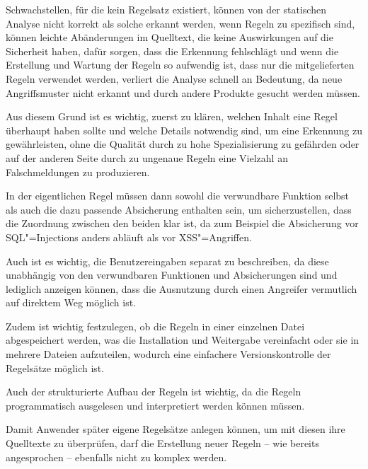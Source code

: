         Schwachstellen,
        für die kein Regelsatz existiert,
        können von der statischen Analyse nicht korrekt als solche erkannt werden,
        wenn Regeln zu spezifisch sind,
        können leichte Abänderungen im Quelltext,
        die keine Auswirkungen auf die Sicherheit haben,
        dafür sorgen,
        dass die Erkennung fehlschlägt und
        wenn die Erstellung und
        Wartung der Regeln so aufwendig ist,
        dass nur die mitgelieferten Regeln verwendet werden,
        verliert die Analyse schnell an Bedeutung,
        da neue Angriffsmuster nicht erkannt und
        durch andere Produkte gesucht werden müssen.

        Aus diesem Grund ist es wichtig,
        zuerst zu klären,
        welchen Inhalt eine Regel überhaupt haben sollte und
        welche Details notwendig sind,
        um eine Erkennung zu gewährleisten,
        ohne die Qualität durch zu hohe Spezialisierung zu gefährden oder
        auf der anderen Seite durch zu ungenaue Regeln eine Vielzahl an Falschmeldungen zu produzieren.

        In der eigentlichen Regel müssen dann sowohl die verwundbare Funktion selbst als auch die dazu passende Absicherung enthalten sein,
        um sicherzustellen,
        dass die Zuordnung zwischen den beiden klar ist,
        da zum Beispiel die Absicherung vor
        \gls{SQL}"=Injections anders abläuft als vor
        \gls{XSS}"=Angriffen.

        Auch ist es wichtig,
        die Benutzereingaben separat zu beschreiben,
        da diese unabhängig von den verwundbaren Funktionen und
        Absicherungen sind und
        lediglich anzeigen können,
        dass die Ausnutzung durch einen Angreifer vermutlich auf direktem Weg möglich ist.

        Zudem ist wichtig festzulegen,
        ob die Regeln in einer einzelnen Datei abgespeichert werden,
        was die Installation und
        Weitergabe vereinfacht oder
        sie in mehrere Dateien aufzuteilen,
        wodurch eine einfachere Versionskontrolle der Regelsätze möglich ist.

        Auch der strukturierte Aufbau der Regeln ist wichtig,
        da die Regeln programmatisch ausgelesen und
        interpretiert werden können müssen.

        Damit Anwender später eigene Regelsätze anlegen können,
        um mit diesen ihre Quelltexte zu überprüfen,
        darf die Erstellung neuer Regeln
        -- wie bereits angesprochen
        -- ebenfalls nicht zu komplex werden.

